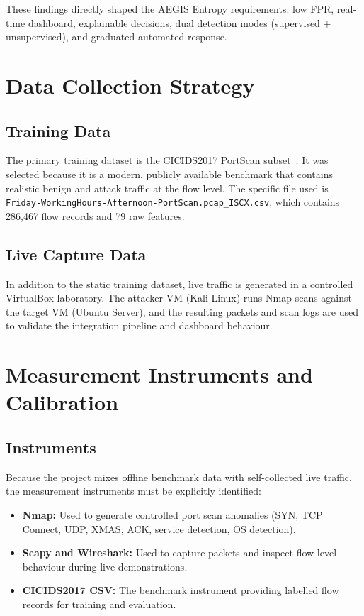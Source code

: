 These findings directly shaped the AEGIS Entropy requirements: low FPR, real-time dashboard, explainable decisions, dual detection modes (supervised + unsupervised), and graduated automated response.

\section{Data Collection Strategy}

\subsection{Training Data}

The primary training dataset is the CICIDS2017 PortScan subset~\cite{cicids2017}. It was selected because it is a modern, publicly available benchmark that contains realistic benign and attack traffic at the flow level. The specific file used is \texttt{Friday-WorkingHours-Afternoon-PortScan.pcap\_ISCX.csv}, which contains 286,467 flow records and 79 raw features.

\subsection{Live Capture Data}

In addition to the static training dataset, live traffic is generated in a controlled VirtualBox laboratory. The attacker VM (Kali Linux) runs Nmap scans against the target VM (Ubuntu Server), and the resulting packets and scan logs are used to validate the integration pipeline and dashboard behaviour.

\section{Measurement Instruments and Calibration}\label{sec:instruments}

\subsection{Instruments}

Because the project mixes offline benchmark data with self-collected live traffic, the measurement instruments must be explicitly identified:

\begin{itemize}
    \item \textbf{Nmap:} Used to generate controlled port scan anomalies (SYN, TCP Connect, UDP, XMAS, ACK, service detection, OS detection).
    \item \textbf{Scapy and Wireshark:} Used to capture packets and inspect flow-level behaviour during live demonstrations.
    \item \textbf{CICIDS2017 CSV:} The benchmark instrument providing labelled flow records for training and evaluation.
\end{itemize}

